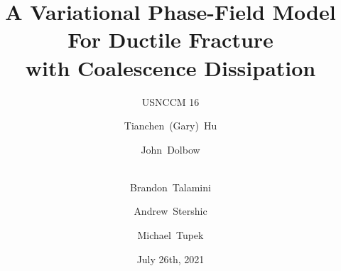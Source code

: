 \title{A Variational Phase-Field Model For Ductile Fracture \\ with Coalescence Dissipation}

\subtitle{USNCCM 16}

\author[shortname]{
  Tianchen~(Gary)~Hu  \and John~Dolbow  \and \\
  Brandon~Talamini  \and Andrew~Stershic  \and Michael~Tupek 
}


\date{July 26th, 2021}
